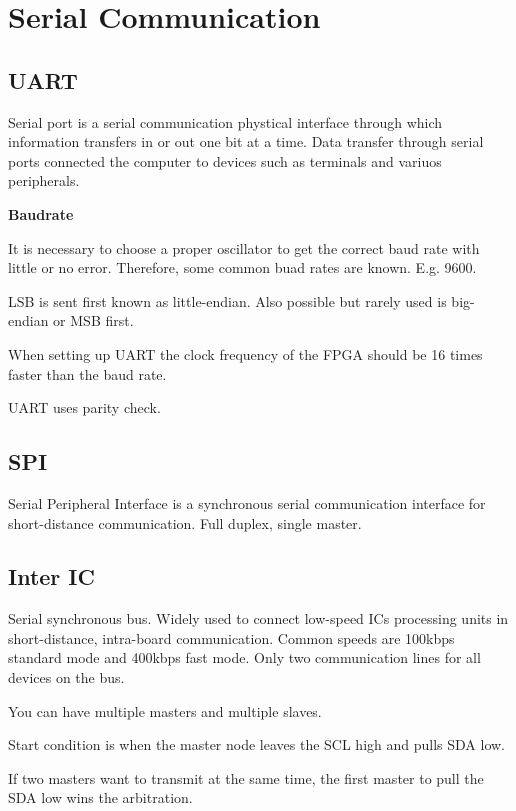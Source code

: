 \section{Serial Communication}


\subsection{UART}

Serial port is a serial communication phystical interface
through which information transfers in or out one bit at a time.
Data transfer through serial ports connected the computer
to devices such as terminals and variuos peripherals.

\textbf{Baudrate}

It is necessary to choose a proper oscillator to get the
correct baud rate with little or no error. Therefore, some common buad
rates are known. E.g. 9600.

LSB is sent first known as little-endian. Also possible but
rarely used is big-endian or MSB first.


When setting up UART the clock frequency of the FPGA should be 16 times faster
than the baud rate.

UART uses parity check.

\subsection{SPI}

Serial Peripheral Interface is a synchronous serial communication interface
for short-distance communication.
Full duplex, single master.



\subsection{Inter IC}

Serial synchronous bus. Widely used to connect low-speed ICs processing
units in short-distance, intra-board communication.
Common speeds are 100kbps standard mode and 400kbps fast mode.
Only two communication lines for all devices on the bus.

You can have multiple masters and multiple slaves.

Start condition is when the master node leaves the SCL high and
pulls SDA low.

If two masters want to transmit at the same time, the
first master to pull the SDA low wins the arbitration.




